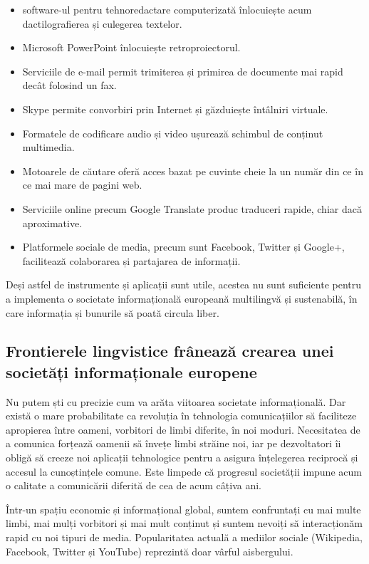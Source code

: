 \begin{multicols}{2}
\begin{itemize}
\item \mbox{software-ul} pentru tehnoredactare computerizată înlocuiește acum dactilografierea și culegerea textelor.
\item Microsoft PowerPoint înlocuiește retroproiectorul.
\item Serviciile de e-mail permit trimiterea și primirea de documente mai rapid decât folosind un fax.
\item Skype permite convorbiri prin Internet și găzduiește întâlniri virtuale.
\item Formatele de codificare audio și video ușurează schimbul de conținut multimedia.
\item Motoarele de căutare oferă acces bazat pe cuvinte cheie la un număr din ce în ce mai mare de pagini web.
\item Serviciile online precum Google Translate produc traduceri rapide, chiar dacă aproximative.
\item Platformele sociale de media, precum sunt Facebook, Twitter și Google+, facilitează colaborarea și partajarea de informații.
\end{itemize}

Deși astfel de instrumente și aplicații sunt utile, acestea nu sunt suficiente pentru a implementa o societate informațională europeană multilingvă și sustenabilă, în care informația și bunurile să poată circula liber.

\subsection{Frontierele lingvistice frânează crearea unei societăți informaționale europene}

Nu putem ști cu precizie cum va arăta viitoarea societate informațională. Dar există o mare probabilitate ca revoluția în tehnologia comunicațiilor să faciliteze apropierea între oameni, vorbitori de limbi diferite, în noi moduri. Necesitatea de a comunica forțează oamenii să învețe limbi străine noi, iar pe dezvoltatori îi obligă să creeze noi aplicații tehnologice pentru a asigura înțelegerea reciprocă și accesul la cunoștințele comune. Este limpede că progresul societății impune acum o calitate a comunicării diferită de cea de acum câțiva ani. 


\mbox{Într-un} spațiu economic și informațional global, suntem confruntați cu mai multe limbi, mai mulți vorbitori și mai mult conținut și suntem nevoiți să interacționăm rapid cu noi tipuri de media. Popularitatea actuală a mediilor sociale (Wikipedia, Facebook, Twitter și YouTube) reprezintă doar vârful aisbergului.


\end{multicols}
